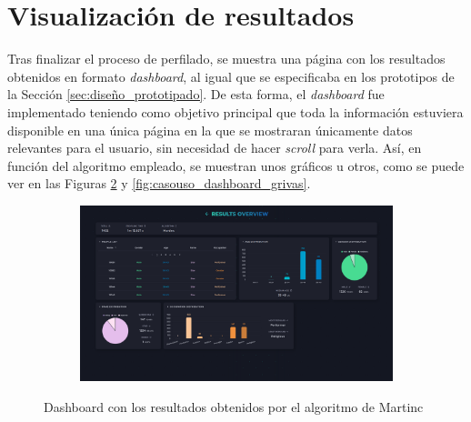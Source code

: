 \section{Visualización de resultados}

Tras finalizar el proceso de perfilado, se muestra una página con los resultados obtenidos en formato \textit{dashboard}, al igual
que se especificaba en los prototipos de la Sección \ref{sec:diseño_prototipado}. De esta forma, el \textit{dashboard} fue
implementado teniendo como objetivo principal que toda la información estuviera disponible en una única página en la que se
mostraran únicamente datos relevantes para el usuario, sin necesidad de hacer \textit{scroll} para verla. Así, en función del algoritmo
empleado, se muestran unos gráficos u otros, como se puede ver en las Figuras \ref{fig:casouso_dashboard_martinc} y
\ref{fig:casouso_dashboard_grivas}.

\bigskip
\begin{figure}[H]
	\centering
	\begin{subfigure}[c]{0.74\textwidth}
			\centering
			\includegraphics[width=\textwidth]{imagenes/dashboard-martinc-500.png}
			\label{fig:casouso_dashboard_martinc_escritorio}
	\end{subfigure}
	\hfill
	\vspace{-1\baselineskip}
	\caption{Dashboard con los resultados obtenidos por el algoritmo de Martinc}
	\label{fig:casouso_dashboard_martinc}
\end{figure}

